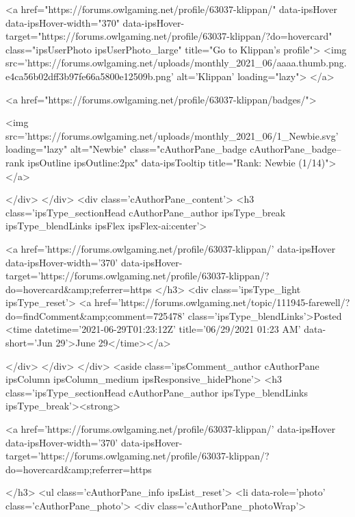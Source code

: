 	<a href="https://forums.owlgaming.net/profile/63037-klippan/" data-ipsHover data-ipsHover-width="370" data-ipsHover-target="https://forums.owlgaming.net/profile/63037-klippan/?do=hovercard" class="ipsUserPhoto ipsUserPhoto_large" title="Go to Klippan's profile">
		<img src='https://forums.owlgaming.net/uploads/monthly_2021_06/aaaa.thumb.png.e4ca56b02dff3b97fe66a5800e12509b.png' alt='Klippan' loading="lazy">
	</a>

				
				
					<a href="https://forums.owlgaming.net/profile/63037-klippan/badges/">
						
<img src='https://forums.owlgaming.net/uploads/monthly_2021_06/1_Newbie.svg' loading="lazy" alt="Newbie" class="cAuthorPane_badge cAuthorPane_badge--rank ipsOutline ipsOutline:2px" data-ipsTooltip title="Rank: Newbie (1/14)">
					</a>
				
			</div>
		</div>
		<div class='cAuthorPane_content'>
			<h3 class='ipsType_sectionHead cAuthorPane_author ipsType_break ipsType_blendLinks ipsFlex ipsFlex-ai:center'>
				


<a href='https://forums.owlgaming.net/profile/63037-klippan/' data-ipsHover data-ipsHover-width='370' data-ipsHover-target='https://forums.owlgaming.net/profile/63037-klippan/?do=hovercard&amp;referrer=https%
			</h3>
			<div class='ipsType_light ipsType_reset'>
				<a href='https://forums.owlgaming.net/topic/111945-farewell/?do=findComment&amp;comment=725478' class='ipsType_blendLinks'>Posted <time datetime='2021-06-29T01:23:12Z' title='06/29/2021 01:23  AM' data-short='Jun 29'>June 29</time></a>
				
			</div>
		</div>
	</div>
	<aside class='ipsComment_author cAuthorPane ipsColumn ipsColumn_medium ipsResponsive_hidePhone'>
		<h3 class='ipsType_sectionHead cAuthorPane_author ipsType_blendLinks ipsType_break'><strong>


<a href='https://forums.owlgaming.net/profile/63037-klippan/' data-ipsHover data-ipsHover-width='370' data-ipsHover-target='https://forums.owlgaming.net/profile/63037-klippan/?do=hovercard&amp;referrer=https%
			
		</h3>
		<ul class='cAuthorPane_info ipsList_reset'>
			<li data-role='photo' class='cAuthorPane_photo'>
				<div class='cAuthorPane_photoWrap'>
					


